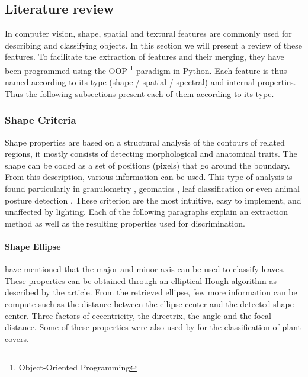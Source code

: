 \documentclass[../thesis.tex]{subfiles}
\begin{document}
    
    \subsection{Literature review}
    \label{sec:weed-discrimination-extracted-features}
    
    In computer vision, shape, spatial and textural features are commonly used for describing and classifying objects. In this section we will present a review of these features. To facilitate the extraction of features and their merging, they have been programmed using the OOP \footnote{Object-Oriented Programming} paradigm in Python. Each feature is thus named according to its type (shape / spatial / spectral) and internal properties. Thus the following subsections present each of them according to its type.
    
    \subsubsection{Shape Criteria}
    
    Shape properties are based on a structural analysis of the contours of related regions, it mostly consists of detecting morphological and anatomical traits.	The shape can be coded as a set of positions (pixels) that go around the boundary. From this description, various information can be used. This type of analysis is found particularly in granulometry \cite{hentschel2003selection}, geomatics \cite{mcgarigal1995spatial}, leaf classification \cite{Cerutti2014} or even animal posture detection \cite{vayssade2019automatic, Bonneau2021}. These criterion are the most intuitive, easy to implement, and unaffected by lighting. Each of the following paragraphs explain an extraction method as well as the resulting properties used for discrimination.
    
    \newpage
    \paragraph{Shape Ellipse} \cite{watcharabutsarakham2012leaf} have mentioned that the major and minor axis can be used to classify leaves. These properties can be obtained through an elliptical Hough algorithm as described by the article. From the retrieved ellipse, few more information can be compute such as the distance between the ellipse center and the detected shape center. Three factors of eccentricity, the directrix, the angle and the focal distance. Some of these properties were also used by \cite{Lottes2016} for the classification of plant covers.
    
\end{document}
